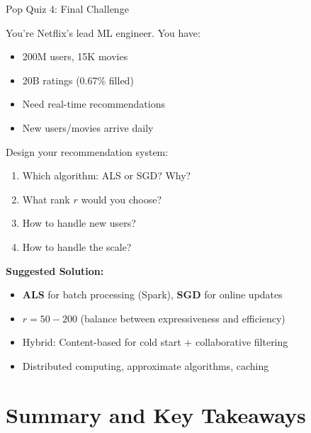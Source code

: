 \documentclass{beamer}
\begin{document}
\begin{frame}{Pop Quiz 4: Final Challenge}
\begin{tcolorbox}[colback=purple!5!white,colframe=purple!75!black,title=Master Check]
You're Netflix's lead ML engineer. You have:
\begin{itemize}
    \item 200M users, 15K movies  
    \item 20B ratings (0.67\% filled)
    \item Need real-time recommendations
    \item New users/movies arrive daily
\end{itemize}

\pause
Design your recommendation system:
\begin{enumerate}[<+->]
    \item Which algorithm: ALS or SGD? Why?
    \item What rank $r$ would you choose?
    \item How to handle new users?
    \item How to handle the scale?
\end{enumerate}

\pause
\textbf{Suggested Solution:}
\begin{itemize}
    \item \textbf{ALS} for batch processing (Spark), \textbf{SGD} for online updates
    \item $r = 50-200$ (balance between expressiveness and efficiency)
    \item Hybrid: Content-based for cold start + collaborative filtering
    \item Distributed computing, approximate algorithms, caching
\end{itemize}
\end{tcolorbox}
\end{frame}

\section{Summary and Key Takeaways}
\end{document}
